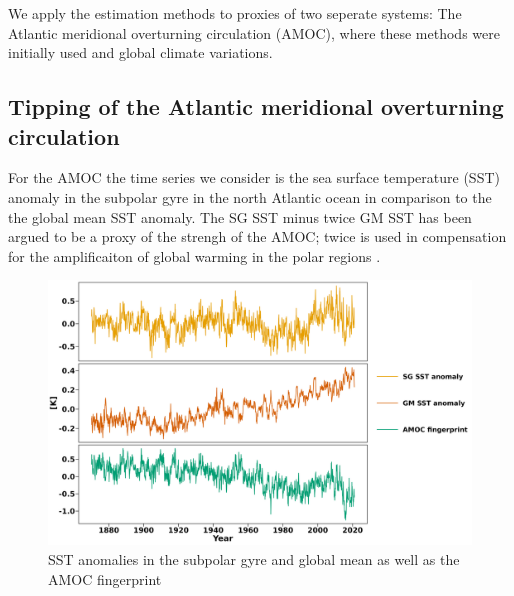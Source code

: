 We apply the estimation methods to proxies of two seperate systems: The Atlantic meridional overturning circulation (AMOC), where these methods were initially used \cite{Ditlevsen2023} and global climate variations.
\subsection{Tipping of the Atlantic meridional overturning circulation}
For the AMOC the time series we consider is the sea surface temperature (SST) anomaly in the subpolar gyre in the north Atlantic ocean in comparison to the the global mean SST anomaly. The SG SST minus twice GM SST has been argued to be a proxy of the strengh of the AMOC; twice is used in compensation for the amplificaiton of global warming in the polar regions \cite[caption of figure 1]{Ditlevsen2023}.
\begin{figure}[h!]
    \begin{center}
    \includegraphics[scale = .075]{figures/AMOC_data_plot.jpeg}
    \caption{SST anomalies in the subpolar gyre and global mean as well as the AMOC fingerprint}
    \label{figure:AMOC_plot}
    \end{center}
\end{figure}

